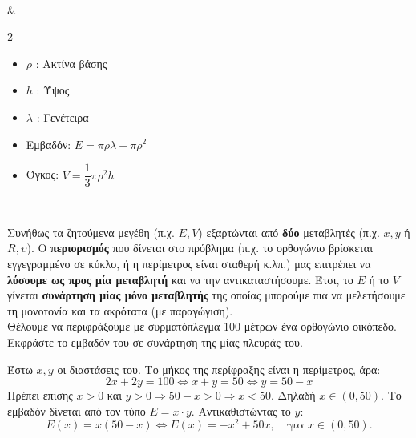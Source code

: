 \begin{center}
\begin{longtblr}
{\\
} & {
\begin{multicols}{2}
\vspace{-4mm}\begin{itemize}[noitemsep]
\item $\rho$ : Ακτίνα βάσης
\item $h$ : Ύψος
\item $\lambda$ : Γενέτειρα
\end{itemize}
\vspace{-4mm}\begin{itemize}[noitemsep]
\item  Εμβαδόν: $E=\pi\rho\lambda+\pi\rho^2$
\item  Όγκος: $V=\dfrac{1}{3}\pi\rho^2h$
\end{itemize}
\end{multicols}}\\
\end{longtblr}
\end{center}

Συνήθως τα ζητούμενα μεγέθη (π.χ. $E, V$) εξαρτώνται από \textbf{δύο} μεταβλητές (π.χ. $x, y$ ή $R, \upsilon$). Ο \textbf{περιορισμός} που δίνεται στο πρόβλημα (π.χ. το ορθογώνιο βρίσκεται εγγεγραμμένο σε κύκλο, ή η περίμετρος είναι σταθερή κ.λπ.) μας επιτρέπει να \textbf{λύσουμε ως προς μία μεταβλητή} και να την αντικαταστήσουμε. Έτσι, το $E$ ή το $V$ γίνεται \textbf{συνάρτηση μίας μόνο μεταβλητής} της οποίας μπορούμε πια να μελετήσουμε τη μονοτονία και τα ακρότατα (με παραγώγιση).\\

Θέλουμε να περιφράξουμε με συρματόπλεγμα 100 μέτρων ένα ορθογώνιο οικόπεδο. Εκφράστε το εμβαδόν του σε συνάρτηση της μίας πλευράς του.

\lysh
Έστω $x, y$ οι διαστάσεις του. Το μήκος της περίφραξης είναι η περίμετρος, άρα:
\[ 2x + 2y = 100 \Leftrightarrow x + y = 50 \Leftrightarrow y = 50 - x \]
Πρέπει επίσης $x > 0$ και $y > 0 \Rightarrow 50 - x > 0 \Rightarrow x < 50$. Δηλαδή $x \in (0, 50)$. Το εμβαδόν δίνεται από τον τύπο $E = x \cdot y$. Αντικαθιστώντας το $y$:
\[ E(x) = x(50 - x) \Leftrightarrow E(x) = -x^2 + 50x, \quad \text{για } x \in (0, 50). \]

